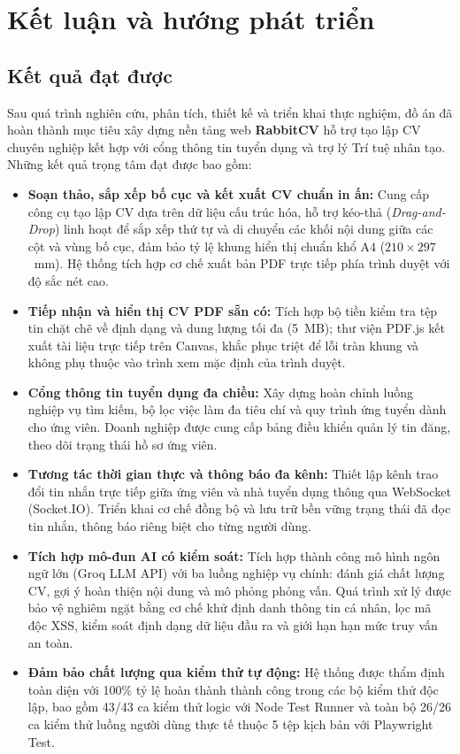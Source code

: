 \chapter{Kết luận và hướng phát triển}

\section{Kết quả đạt được}

Sau quá trình nghiên cứu, phân tích, thiết kế và triển khai thực nghiệm, đồ án đã hoàn thành mục tiêu xây dựng nền tảng web \textbf{RabbitCV} hỗ trợ tạo lập CV chuyên nghiệp kết hợp với cổng thông tin tuyển dụng và trợ lý Trí tuệ nhân tạo. Những kết quả trọng tâm đạt được bao gồm:

\begin{itemize}
    \item \textbf{Soạn thảo, sắp xếp bố cục và kết xuất CV chuẩn in ấn:} Cung cấp công cụ tạo lập CV dựa trên dữ liệu cấu trúc hóa, hỗ trợ kéo-thả (\textit{Drag-and-Drop}) linh hoạt để sắp xếp thứ tự và di chuyển các khối nội dung giữa các cột và vùng bố cục, đảm bảo tỷ lệ khung hiển thị chuẩn khổ A4 ($210 \times 297$~mm). Hệ thống tích hợp cơ chế xuất bản PDF trực tiếp phía trình duyệt với độ sắc nét cao.
    
    \item \textbf{Tiếp nhận và hiển thị CV PDF sẵn có:} Tích hợp bộ tiền kiểm tra tệp tin chặt chẽ về định dạng và dung lượng tối đa (5~MB); thư viện PDF.js kết xuất tài liệu trực tiếp trên Canvas, khắc phục triệt để lỗi tràn khung và không phụ thuộc vào trình xem mặc định của trình duyệt.
    
    \item \textbf{Cổng thông tin tuyển dụng đa chiều:} Xây dựng hoàn chỉnh luồng nghiệp vụ tìm kiếm, bộ lọc việc làm đa tiêu chí và quy trình ứng tuyển dành cho ứng viên. Doanh nghiệp được cung cấp bảng điều khiển quản lý tin đăng, theo dõi trạng thái hồ sơ ứng viên.

    \item \textbf{Tương tác thời gian thực và thông báo đa kênh:} Thiết lập kênh trao đổi tin nhắn trực tiếp giữa ứng viên và nhà tuyển dụng thông qua WebSocket (Socket.IO). Triển khai cơ chế đồng bộ và lưu trữ bền vững trạng thái đã đọc tin nhắn, thông báo riêng biệt cho từng người dùng.

    \item \textbf{Tích hợp mô-đun AI có kiểm soát:} Tích hợp thành công mô hình ngôn ngữ lớn (Groq LLM API) với ba luồng nghiệp vụ chính: đánh giá chất lượng CV, gợi ý hoàn thiện nội dung và mô phỏng phỏng vấn. Quá trình xử lý được bảo vệ nghiêm ngặt bằng cơ chế khử định danh thông tin cá nhân, lọc mã độc XSS, kiểm soát định dạng dữ liệu đầu ra và giới hạn hạn mức truy vấn an toàn.

    \item \textbf{Đảm bảo chất lượng qua kiểm thử tự động:} Hệ thống được thẩm định toàn diện với 100\% tỷ lệ hoàn thành thành công trong các bộ kiểm thử độc lập, bao gồm 43/43 ca kiểm thử logic với Node Test Runner và toàn bộ 26/26 ca kiểm thử luồng người dùng thực tế thuộc 5 tệp kịch bản với Playwright Test.
\end{itemize}

